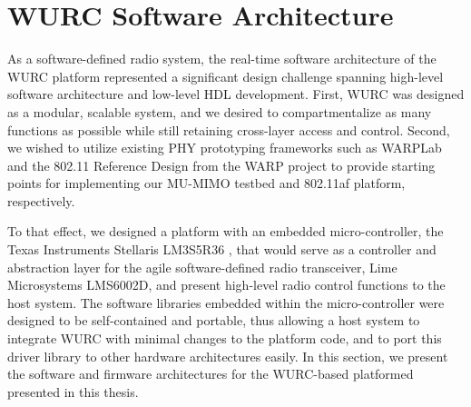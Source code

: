 %
%
%



 \section{WURC Software Architecture}
\label{sec_wurc_sw_arch}

	As a software-defined radio system, the real-time software architecture of the \ac{WURC} platform represented a significant design challenge spanning high-level software architecture and low-level \ac{HDL} development.
	First, \ac{WURC} was designed as a modular, scalable system, and we desired to compartmentalize as many functions as possible while still retaining cross-layer access and control.
	Second, we wished to utilize existing \ac{PHY} prototyping frameworks such as WARPLab \cite{warplab} and the 802.11 Reference Design \cite{warp80211} from the \ac{WARP} project to provide starting points for implementing our \ac{MU-MIMO} testbed and 802.11af platform, respectively.

	To that effect, we designed a platform with an embedded micro-controller, the Texas Instruments Stellaris LM3S5R36 \cite{ti2012stellaris}, that would serve as a controller and abstraction layer for the agile software-defined radio transceiver, Lime Microsystems LMS6002D, and present high-level radio control functions to the host system.
	The software libraries embedded within the micro-controller were designed to be self-contained and portable, thus allowing a host system to integrate \ac{WURC} with minimal changes to the platform code, and to port this driver library to other hardware architectures easily.
	In this section, we present the software and firmware architectures for the WURC-based platformed presented in this thesis.

